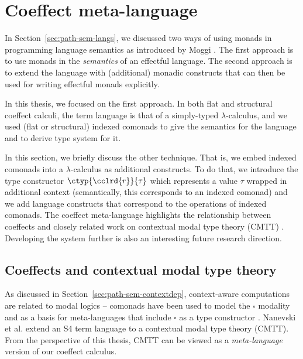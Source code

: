 \section{Coeffect meta-language}
\label{sec:further-meta}

In Section~\ref{sec:path-sem-langs}, we discussed two ways of using monads in programming
language semantics as introduced by Moggi \cite{monad-notions}. The first approach is to use
monads in the \emph{semantics} of an effectful language. The second approach is to extend the
language with (additional) monadic constructs that can then be used for writing effectful
monads explicitly.

In this thesis, we focused on the first approach. In both flat and structural coeffect calculi,
the term language is that of a simply-typed $\lambda$-calculus, and we used (flat or structural)
indexed comonads to give the semantics for the language and to derive type system for it.

In this section, we briefly discuss the other technique. That is, we embed indexed
comonads into a $\lambda$-calculus as additional constructs. To do that, we introduce the
type constructor $\ctyp{\cclrd{r}}{\tau}$ which represents a value $\tau$ wrapped in additional
context (semantically, this corresponds to an indexed comonad) and we add language constructs
that correspond to the operations of indexed comonads. The coeffect meta-language highlights the
relationship between coeffects and closely related work on contextual modal type theory (CMTT)
\cite{logic-cmtt}. Developing the system further is also an interesting future research direction.


\subsection{Coeffects and contextual modal type theory}

As discussed in Section~\ref{sec:path-sem-contextdep}, context-aware computations are related
to modal logics -- comonads have been used to model the $\square$ modality and as a basis for
meta-languages that include $\square$ as a type constructor
\cite{logic-intuitionistic-modal,logic-modal-reconstruction,logic-intuitionistic-modal,logic-cmtt}.
Nanevski et al. \cite{logic-cmtt} extend an S4 term language to a contextual modal type theory (CMTT).
From the perspective of this thesis, CMTT can be viewed as a \emph{meta-language} version of our
coeffect calculus.


